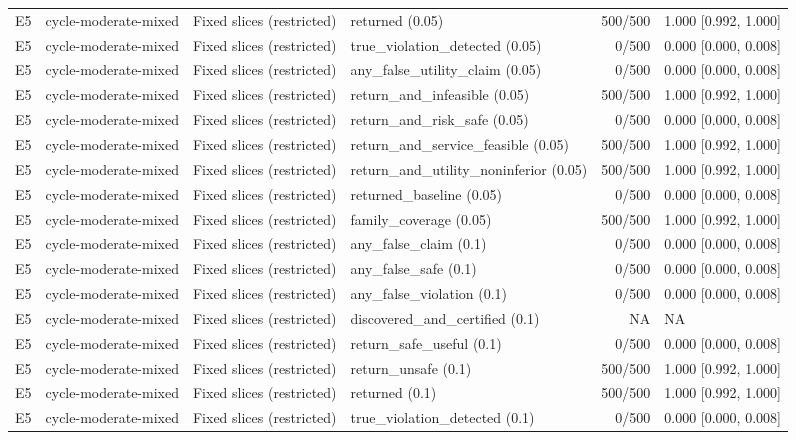 \begin{longtable}{p{.04\linewidth}p{.18\linewidth}p{.19\linewidth}p{.16\linewidth}r p{.21\linewidth}}
E5 & cycle-moderate-mixed & Fixed slices (restricted) & returned (0.05) & 500/500 & 1.000 [0.992, 1.000]\\
E5 & cycle-moderate-mixed & Fixed slices (restricted) & true\_violation\_detected (0.05) & 0/500 & 0.000 [0.000, 0.008]\\
E5 & cycle-moderate-mixed & Fixed slices (restricted) & any\_false\_utility\_claim (0.05) & 0/500 & 0.000 [0.000, 0.008]\\
E5 & cycle-moderate-mixed & Fixed slices (restricted) & return\_and\_infeasible (0.05) & 500/500 & 1.000 [0.992, 1.000]\\
E5 & cycle-moderate-mixed & Fixed slices (restricted) & return\_and\_risk\_safe (0.05) & 0/500 & 0.000 [0.000, 0.008]\\
E5 & cycle-moderate-mixed & Fixed slices (restricted) & return\_and\_service\_feasible (0.05) & 500/500 & 1.000 [0.992, 1.000]\\
E5 & cycle-moderate-mixed & Fixed slices (restricted) & return\_and\_utility\_noninferior (0.05) & 500/500 & 1.000 [0.992, 1.000]\\
E5 & cycle-moderate-mixed & Fixed slices (restricted) & returned\_baseline (0.05) & 0/500 & 0.000 [0.000, 0.008]\\
E5 & cycle-moderate-mixed & Fixed slices (restricted) & family\_coverage (0.05) & 500/500 & 1.000 [0.992, 1.000]\\
E5 & cycle-moderate-mixed & Fixed slices (restricted) & any\_false\_claim (0.1) & 0/500 & 0.000 [0.000, 0.008]\\
E5 & cycle-moderate-mixed & Fixed slices (restricted) & any\_false\_safe (0.1) & 0/500 & 0.000 [0.000, 0.008]\\
E5 & cycle-moderate-mixed & Fixed slices (restricted) & any\_false\_violation (0.1) & 0/500 & 0.000 [0.000, 0.008]\\
E5 & cycle-moderate-mixed & Fixed slices (restricted) & discovered\_and\_certified (0.1) & NA & NA\\
E5 & cycle-moderate-mixed & Fixed slices (restricted) & return\_safe\_useful (0.1) & 0/500 & 0.000 [0.000, 0.008]\\
E5 & cycle-moderate-mixed & Fixed slices (restricted) & return\_unsafe (0.1) & 500/500 & 1.000 [0.992, 1.000]\\
E5 & cycle-moderate-mixed & Fixed slices (restricted) & returned (0.1) & 500/500 & 1.000 [0.992, 1.000]\\
E5 & cycle-moderate-mixed & Fixed slices (restricted) & true\_violation\_detected (0.1) & 0/500 & 0.000 [0.000, 0.008]\\

\end{longtable}
